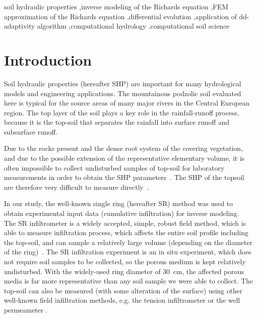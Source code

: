 \documentclass[review,times,3p,twocolumn,10pt]{elsarticle}
\begin{document}
\begin{frontmatter}
\begin{abstract}

\end{abstract}

\begin{keyword}
soil hydraulic properties \sep inverse modeling of the Richards equation \sep FEM approximation of the Richards equation \sep differential evolution \sep application of dd-adaptivity algorithm \sep computational hydrology \sep computational soil science


\end{keyword}

\end{frontmatter}

\linenumbers

\section{Introduction}%

Soil hydraulic properties (hereafter SHP) are important for many hydrological models and engineering applications. The mountainous podzolic soil evaluated here is typical for the source areas of many major rivers in the Central European region. The top layer of the soil plays a key role in the rainfall-runoff process, because it is the top-soil that separates the rainfall into surface runoff and subsurface runoff. 


Due to the rocks present and the dense root system of the covering vegetation, and due to the possible extension of the representative elementary volume, it is often impossible to collect undisturbed samples of top-soil for laboratory measurements in order to obtain the SHP parameters~\citep{Jacka1}. The SHP of the topsoil are therefore very difficult to measure directly~\citep{Fodor, Jacka1}. 


In our study, the well-known single ring (hereafter SR) method was used to obtain experimental input data (cumulative infiltration) for inverse modeling. The SR infiltrometer is a widely accepted, simple, robust field method, which is able to measure infiltration process, which affects the entire soil profile including the top-soil,  and can sample a relatively large volume (depending on the diameter of the ring)~\citep{Cheng,ReynoldsWD}.  The SR infiltration experiment is an in situ experiment, which does not require soil samples to be collected, so the porous medium is kept relatively undisturbed. With the widely-used ring diameter of 30~cm, the affected porous media is far more representative than any soil sample  we were able to collect. The top-soil can also be measured (with some alteration of the surface) using other well-known field infiltration methods, e.g. the tension infiltrometer or the well permeameter  \citep{AnguloJaramillo,ReynoldsWDGP}. 
\end{document}
